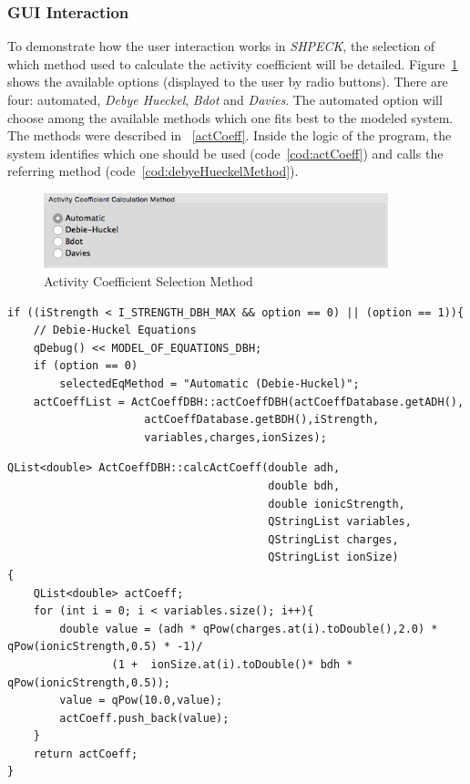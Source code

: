\subsubsection{GUI Interaction}
To demonstrate how the user interaction works in \emph{SHPECK}, the selection of which method used to calculate the activity coefficient will be detailed. Figure~\ref{fig:radioAct} shows the available options (displayed to the user by radio buttons). There are four: automated, \emph{Debye Hueckel}, \emph{Bdot} and \emph{Davies}. The automated option will choose among the available methods which one fits best to the modeled system. The methods were described in ~\ref{actCoeff}. Inside the logic of the program, the system identifies which one should be used (code~\ref{cod:actCoeff}) and calls the referring method (code~\ref{cod:debyeHueckelMethod}). 

\begin{figure}[ht!]
\centering
\includegraphics[width=100mm]{figures/radioAct.png}
\caption{Activity Coefficient Selection Method}
\label{fig:radioAct}
\end{figure}


\begin{minipage}{0.8\linewidth}
\begin{lstlisting}[frame=single, label=cod:actCoeff, caption=Activity coefficient calculation method implementation]
if ((iStrength < I_STRENGTH_DBH_MAX && option == 0) || (option == 1)){
    // Debie-Huckel Equations
    qDebug() << MODEL_OF_EQUATIONS_DBH;
    if (option == 0)
        selectedEqMethod = "Automatic (Debie-Huckel)";
    actCoeffList = ActCoeffDBH::actCoeffDBH(actCoeffDatabase.getADH(),
                     actCoeffDatabase.getBDH(),iStrength,
                     variables,charges,ionSizes);

\end{lstlisting}
\end{minipage}

\begin{minipage}{0.8\linewidth}
\begin{lstlisting}[frame=single, label=cod:debyeHueckelMethod, caption=Debye Hueckel method implementation]
QList<double> ActCoeffDBH::calcActCoeff(double adh,
                                        double bdh,
                                        double ionicStrength,
                                        QStringList variables,
                                        QStringList charges,
                                        QStringList ionSize)
{
    QList<double> actCoeff;
    for (int i = 0; i < variables.size(); i++){
        double value = (adh * qPow(charges.at(i).toDouble(),2.0) * qPow(ionicStrength,0.5) * -1)/
                (1 +  ionSize.at(i).toDouble()* bdh * qPow(ionicStrength,0.5));
        value = qPow(10.0,value);
        actCoeff.push_back(value);
    }
    return actCoeff;
}

\end{lstlisting}
\end{minipage}

